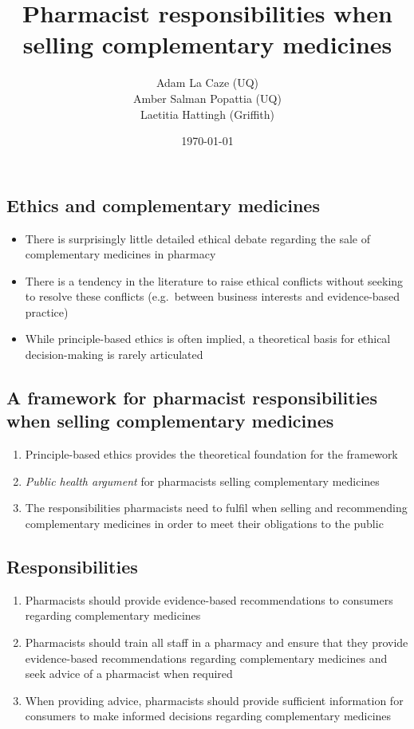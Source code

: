 \documentclass[]{article}
\title{Pharmacist responsibilities when selling complementary medicines}
\author{Adam La Caze (UQ) \\ Amber Salman Popattia (UQ) \\ Laetitia Hattingh (Griffith)}
\date{\today}
\begin{document}
\maketitle

\subsection{Ethics and complementary
medicines}\label{ethics-and-complementary-medicines}

\begin{itemize}
\item
  There is surprisingly little detailed ethical debate regarding the
  sale of complementary medicines in pharmacy
  \autocites{SalmanPopattia2018}{Ung2017}
\item
  There is a tendency in the literature to raise ethical conflicts
  without seeking to resolve these conflicts (e.g.~between business
  interests and evidence-based practice)
\item
  While principle-based ethics is often implied, a theoretical basis for
  ethical decision-making is rarely articulated
\end{itemize}

\subsection{A framework for pharmacist responsibilities when selling
complementary
medicines}\label{a-framework-for-pharmacist-responsibilities-when-selling-complementary-medicines}

\begin{enumerate}
\def\labelenumi{\arabic{enumi}.}
\item
  Principle-based ethics provides the theoretical foundation for the
  framework \autocite{Beauchamp2012}
\item
  \emph{Public health argument} for pharmacists selling complementary
  medicines
\item
  The responsibilities pharmacists need to fulfil when selling and
  recommending complementary medicines in order to meet their
  obligations to the public
\end{enumerate}

\subsection{Responsibilities}\label{responsibilities}

\begin{enumerate}
\def\labelenumi{\arabic{enumi}.}
\item
  Pharmacists should provide evidence-based recommendations to consumers
  regarding complementary medicines
\item
  Pharmacists should train all staff in a pharmacy and ensure that they
  provide evidence-based recommendations regarding complementary
  medicines and seek advice of a pharmacist when required
\item
  When providing advice, pharmacists should provide sufficient
  information for consumers to make informed decisions regarding
  complementary medicines
\end{enumerate}
\end{document}
